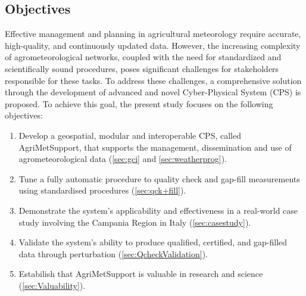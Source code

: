 \documentclass[authoryear,preprint,review,12pt]{elsarticle}
\newcommand{\statusblock}[3]{
    \ifthenelse{\equal{#2}{todo}}
        {\textcolor{red}{#1 (TO DO): #3}}
        {}
    \ifthenelse{\equal{#2}{wip}}
        {\textcolor{magenta}{#1 (IN PROGRESS): #3}}
        {}
    \ifthenelse{\equal{#2}{update}}
        {\textcolor{blue}{#1 (UPDATE): #3}}
        {}
    \ifthenelse{\equal{#2}{review}}
        {\textcolor{cyan}{#1 (REVIEW): #3}}
        {}
    \ifthenelse{\equal{#2}{done}}
        {\textcolor{PineGreen}{#1 (READY): #3}}
        {}
}
\begin{document}


\subsection{Objectives}
Effective management and planning in agricultural meteorology require accurate, high-quality, and continuously updated data.
However, the increasing complexity of agrometeorological networks, coupled with the need for standardized and scientifically sound procedures, poses significant challenges for stakeholders responsible for these tasks.
To address these challenges, a comprehensive solution through the development of advanced and novel Cyber-Physical System (CPS) is proposed.
To achieve this goal, the present study focuses on the following objectives:
\begin{enumerate}
    \item Develop a %
    geospatial, modular and interoperable CPS, called Agri\-Met\-Support, that supports the  management, dissemination and use of agrometeorological data (\cref{sec:gci} and \cref{sec:weatherprog}).
    \item Tune a fully automatic procedure %
    to quality check and gap-fill measurements using standardised procedures (\cref{sec:qck+fill}). %
    \item Demonstrate the system's applicability and effectiveness in a real-world case study involving the Campania Region in Italy (\cref{sec:casestudy}).
    \item Validate the system's ability to produce qualified, certified, and gap-filled data through perturbation (\cref{sec:QcheckValidation}).
    \item %
    Estabilish that AgriMetSupport is valuable in research and science (\cref{sec:Valuability}).
\end{enumerate}
\end{document}

